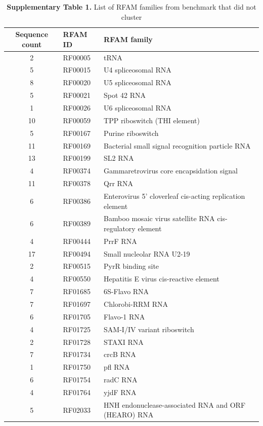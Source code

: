 \documentclass{bmcart}
\begin{document}
\begin{table}
\centering
\caption*{\textbf{Supplementary Table 1.}  List of RFAM families from benchmark that did not cluster}
\begin{tabular}{cll}
\hline
Sequence count & RFAM ID & RFAM family \\
\hline
2 & RF00005 &  tRNA \\
5 & RF00015 &  U4 spliceosomal RNA \\
8 & RF00020 &  U5 spliceosomal RNA \\
5 & RF00021 &  Spot 42 RNA \\
1 & RF00026 &  U6 spliceosomal RNA \\
10 & RF00059 &  TPP riboswitch (THI element) \\
5 & RF00167 &  Purine riboswitch \\
11 & RF00169 &  Bacterial small signal recognition particle RNA \\
13 & RF00199 &  SL2 RNA \\
4 & RF00374 &  Gammaretrovirus core encapsidation signal \\
11 & RF00378 &  Qrr RNA \\
6 & RF00386 &  Enterovirus 5' cloverleaf cis-acting replication element \\
6 & RF00389 &  Bamboo mosaic virus satellite RNA cis-regulatory element \\
4 & RF00444 &  PrrF RNA \\
17 & RF00494 &  Small nucleolar RNA U2-19 \\
2 & RF00515 &  PyrR binding site \\
4 & RF00550 &  Hepatitis E virus cis-reactive element \\
7 & RF01685 &  6S-Flavo RNA \\
7 & RF01697 &  Chlorobi-RRM RNA \\
6 & RF01705 &  Flavo-1 RNA \\
4 & RF01725 &  SAM-I/IV variant riboswitch \\
2 & RF01728 &  STAXI RNA \\
7 & RF01734 &  crcB RNA \\
1 & RF01750 &  pfl RNA \\
6 & RF01754 &  radC RNA \\
4 & RF01764 &  yjdF RNA \\
5 & RF02033 &  HNH endonuclease-associated RNA and ORF (HEARO) RNA \\
\hline
\end{tabular}
\end{table}
\end{document}
